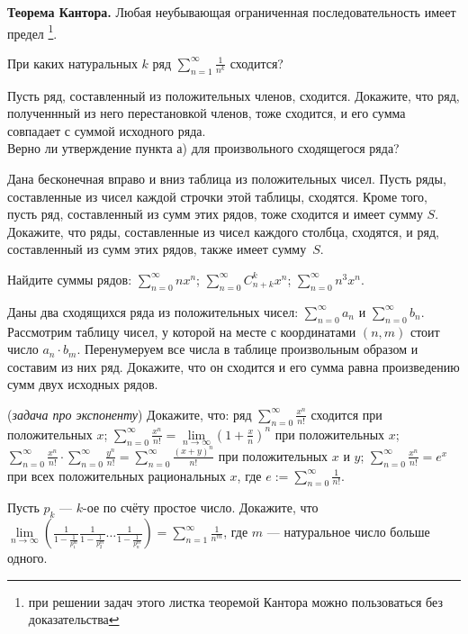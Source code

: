 \documentclass[a4paper, 12pt]{article}
\newcommand{\0}[1]{\overline{#1}}
\begin{document}
{\bf Теорема Кантора.} Любая неубывающая ограниченная последовательность имеет предел
\footnote{при решении задач этого листка
теоремой Кантора можно пользоваться без доказательства}.

%
При каких натуральных $k$ ряд $\sum\limits_{n=1}^\infty \frac{1}{n^k}$ сходится?

Пусть ряд, составленный из положительных членов, сходится. Докажите, что ряд, полученнный из него перестановкой членов, тоже сходится, и его сумма совпадает с суммой исходного ряда.
\\
Верно ли утверждение пункта а) для произвольного сходящегося ряда?

 Дана бесконечная вправо и вниз таблица из положительных чисел.
Пусть ряды, составленные из чисел каждой строчки этой таблицы, сходятся.
Кроме того, пусть ряд, составленный из сумм этих рядов, тоже сходится и имеет сумму $S$.
Докажите, что ряды, составленные из чисел каждого столбца, сходятся,
и ряд, составленный из сумм этих рядов, также имеет сумму~$S$.

 Найдите суммы рядов:
$\sum\limits_{n=0}^{\infty}nx^n$;
$\sum\limits_{n=0}^{\infty}C_{n+k}^kx^n$;
$\sum\limits_{n=0}^{\infty} n^3 x^n$.

 Даны два сходящихся ряда из положительных чисел:
$\sum\limits_{n=0}^{\infty}a_n$ и $\sum\limits_{n=0}^{\infty}b_n$.
Рассмотрим таблицу чисел, у которой на месте с координатами $(n,m)$
стоит число $a_n\cdot b_m$.
Перенумеруем все числа в таблице произвольным образом и составим из них ряд.
Докажите, что он сходится и его сумма равна произведению сумм двух исходных рядов.

 ({\it задача про экспоненту}) Докажите, что:
ряд $\sum\limits_{n=0}^{\infty}\frac{x^n}{n!}$ сходится при положительных $x$;
$\sum\limits_{n=0}^{\infty}\frac{x^n}{n!}=\lim\limits_{n\to\infty}(1+\frac{x}{n})^n$ при положительных $x$;
$\sum\limits_{n=0}^{\infty}\frac{x^n}{n!}\cdot\sum\limits_{n=0}^{\infty}\frac{y^n}{n!}=\sum\limits_{n=0}^{\infty}\frac{(x+y)^n}{n!}$ при положительных $x$ и $y$;
$\sum\limits_{n=0}^{\infty}\frac{x^n}{n!}=e^x$ при всех положительных рациональных $x$, где $e:=\sum\limits_{n=0}^{\infty}\frac{1}{n!}$.

 Пусть $p_k$ --- $k$-ое по счёту простое число. Докажите, что $\lim\limits_{n\to\infty} (\frac1{1-\frac1{p_1^m}}\frac1{1-\frac1{p_2^m}}\dots\frac1{1-\frac1{p_n^m}}) = \sum\limits_{n=1}^{\infty}\frac1{n^m}$, где $m$ --- натуральное число больше одного.
\end{document}
